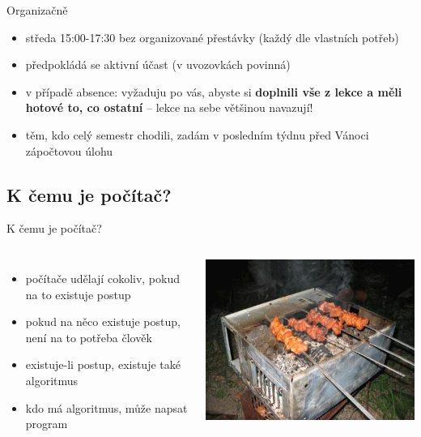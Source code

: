 \documentclass{beamer}
\begin{document}
\begin{frame}{Organizačně}
  \begin{itemize}
    \item středa 15:00-17:30 bez organizované přestávky (každý dle vlastních potřeb)
    \item předpokládá se aktivní účast (v uvozovkách povinná)
    \item v případě absence: vyžaduju po vás, abyste si \textbf{doplnili vše z lekce a měli hotové to, co ostatní} -- lekce na sebe většinou navazují!
    \item těm, kdo celý semestr chodili, zadám v posledním týdnu před Vánoci zápočtovou úlohu
  \end{itemize}
\end{frame}

\subsection{K čemu je počítač?}

\begin{frame}{K čemu je počítač?}
  \begin{columns}
    \begin{itemize}
      \item počítače udělají cokoliv, pokud na to existuje postup
      \item pokud na něco existuje postup, není na to potřeba člověk
      \item existuje-li postup, existuje také algoritmus
      \item kdo má algoritmus, může napsat program
    \end{itemize}
    \includegraphics[width=\columnwidth]{computerbarbie}
  \end{columns}
\end{frame}
\end{document}
